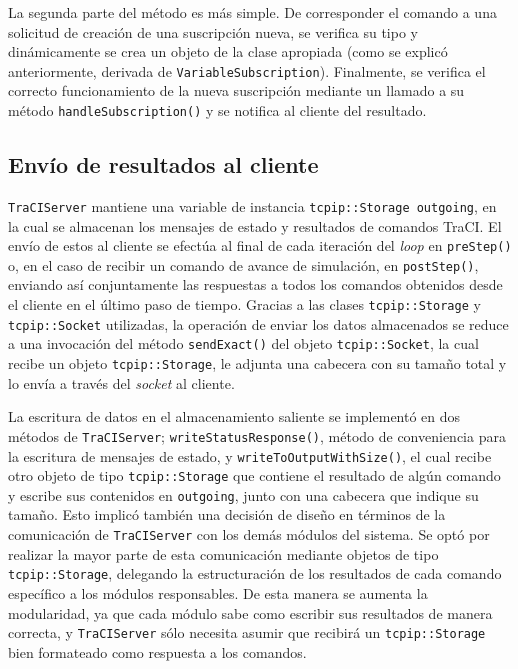 La segunda parte del método es más simple. De corresponder el comando a una solicitud de creación de una suscripción nueva, se verifica su tipo y dinámicamente se crea un objeto de la clase apropiada (como se explicó anteriormente, derivada de \texttt{VariableSubscription}). Finalmente, se verifica el correcto funcionamiento de la nueva suscripción mediante un llamado a su método \texttt{handleSubscription()} y se notifica al cliente del resultado.

\begin{figure*}[h]
    
\end{figure*}
    
%    

\subsection{Envío de resultados al cliente}

\texttt{TraCIServer} mantiene una variable de instancia \texttt{tcpip::Storage outgoing}, en la cual se almacenan los mensajes de estado y resultados de comandos TraCI. El envío de estos al cliente se efectúa al final de cada iteración del \emph{loop} en \texttt{preStep()} o, en el caso de recibir un comando de avance de simulación, en \texttt{postStep()}, enviando así conjuntamente las respuestas a todos los comandos obtenidos desde el cliente en el último paso de tiempo. Gracias a las clases \texttt{tcpip::Storage} y \texttt{tcpip::Socket} utilizadas, la operación de enviar los datos almacenados se reduce a una invocación del método \texttt{sendExact()} del objeto \texttt{tcpip::Socket}, la cual recibe un objeto \texttt{tcpip::Storage}, le adjunta una cabecera con su tamaño total y lo envía a través del \emph{socket} al cliente.

La escritura de datos en el almacenamiento saliente se implementó en dos métodos de \texttt{TraCIServer}; \texttt{writeStatusResponse()}, método de conveniencia para la escritura de mensajes de estado, y \texttt{writeToOutputWithSize()}, el cual recibe otro objeto de tipo \texttt{tcpip::Storage} que contiene el resultado de algún comando y escribe sus contenidos en \texttt{outgoing}, junto con una cabecera que indique su tamaño. Esto implicó también una decisión de diseño en términos de la comunicación de \texttt{TraCIServer} con los demás módulos del sistema. Se optó por realizar la mayor parte de esta comunicación mediante objetos de tipo \texttt{tcpip::Storage}, delegando la estructuración de los resultados de cada comando específico a los módulos responsables. De esta manera se aumenta la modularidad, ya que cada módulo sabe como escribir sus resultados de manera correcta, y \texttt{TraCIServer} sólo necesita asumir que recibirá un \texttt{tcpip::Storage} bien formateado como respuesta a los comandos.

\begin{figure*}[h]

\end{figure*}